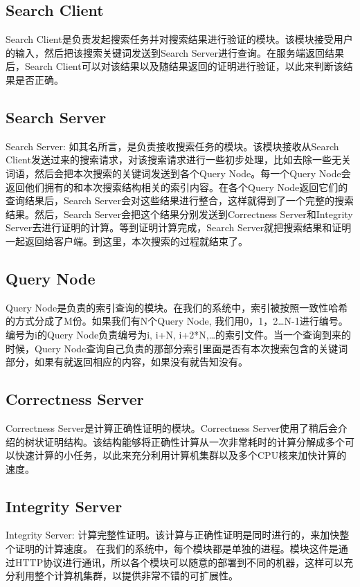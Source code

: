 \subsection{Search Client}
Search Client是负责发起搜索任务并对搜索结果进行验证的模块。该模块接受用户的输入，然后把该搜索关键词发送到Search Server进行查询。在服务端返回结果后，Search Client可以对该结果以及随结果返回的证明进行验证，以此来判断该结果是否正确。

\subsection{Search Server}
Search Server: 如其名所言，是负责接收搜索任务的模块。该模块接收从Search Client发送过来的搜索请求，对该搜索请求进行一些初步处理，比如去除一些无关词语，然后会把本次搜索的关键词发送到各个Query Node。每一个Query Node会返回他们拥有的和本次搜索结构相关的索引内容。在各个Query Node返回它们的查询结果后，Search Server会对这些结果进行整合，这样就得到了一个完整的搜索结果。然后，Search Server会把这个结果分别发送到Correctness Server和Integrity Server去进行证明的计算。等到证明计算完成，Search Server就把搜索结果和证明一起返回给客户端。到这里，本次搜索的过程就结束了。

\subsection{Query Node}
Query Node是负责的索引查询的模块。在我们的系统中，索引被按照一致性哈希的方式分成了M份。如果我们有N个Query Node, 我们用0，1，2…N-1进行编号。编号为i的Query Node负责编号为i, i+N, i+2*N,…的索引文件。当一个查询到来的时候，Query Node查询自己负责的那部分索引里面是否有本次搜索包含的关键词部分，如果有就返回相应的内容，如果没有就告知没有。

\subsection{Correctness Server}
Correctness Server是计算正确性证明的模块。Correctness Server使用了稍后会介绍的树状证明结构。该结构能够将正确性计算从一次非常耗时的计算分解成多个可以快速计算的小任务，以此来充分利用计算机集群以及多个CPU核来加快计算的速度。

\subsection{Integrity Server}
Integrity Server: 计算完整性证明。该计算与正确性证明是同时进行的，来加快整个证明的计算速度。
在我们的系统中，每个模块都是单独的进程。模块这件是通过HTTP协议进行通讯，所以各个模块可以随意的部署到不同的机器，这样可以充分利用整个计算机集群，以提供非常不错的可扩展性。


